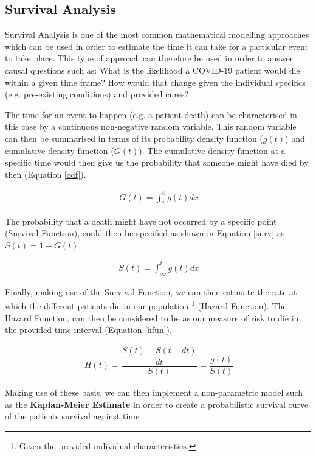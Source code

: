 \subsection{Survival Analysis}
\label{surv_app}
Survival Analysis is one of the most common mathematical modelling approaches which can be used in order to estimate the time it can take for a particular event to take place. This type of approach can therefore be used in order to answer causal questions such as: What is the likelihood a COVID-19 patient would die within a given time frame? How would that change given the individual specifics (e.g. pre-existing conditions) and provided cures?

The time for an event to happen (e.g. a patient death) can be characterised in this case by a continuous non-negative random variable. This random variable can then be summarised in terms of its probability density function ($g(t)$) and cumulative density function ($G(t)$). The cumulative density function at a specific time would then give us the probability that someone might have died by then (Equation \ref{cdf}).

\useshortskip
\begin{align}
\ G(t) =\int_{t}^{0} g(t) dx
\label{cdf}
\end{align}
\useshortskip

The probability that a death might have not occurred by a specific point (Survival Function), could then be specified as shown in Equation \ref{surv} as $S(t) = 1 - G(t)$.

\useshortskip
\begin{align}
\ S(t) =\int_{\infty}^{t} g(t) dx
\label{surv}
\end{align}
\useshortskip

Finally, making use of the Survival Function, we can then estimate the rate at which the different patients die in our population \footnote{Given the provided individual characteristics.} (Hazard Function). The Hazard Function, can then be considered to be as our measure of risk to die in the provided time interval (Equation \ref{hfun}).

\useshortskip
\begin{align}
\ H(t) = \dfrac{\dfrac{S(t) - S(t - dt)}{dt}}{S(t)} = \dfrac{g(t)}{S(t)}
\label{hfun}
\end{align}
\useshortskip

Making use of these basis, we can then implement a non-parametric model such as the \textbf{Kaplan-Meier Estimate} in order to create a probabilistic survival curve of the patients survival against time \cite{survival_an}.

